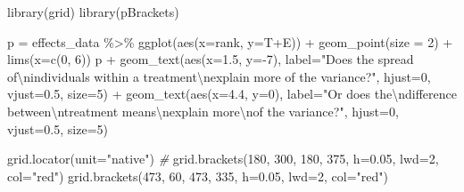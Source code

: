 \documentclass[
]{book}
\newenvironment{Shaded}{\begin{snugshade}}{\end{snugshade}}
\newcommand{\AttributeTok}[1]{\textcolor[rgb]{0.77,0.63,0.00}{#1}}
\newcommand{\CommentTok}[1]{\textcolor[rgb]{0.56,0.35,0.01}{\textit{#1}}}
\newcommand{\DecValTok}[1]{\textcolor[rgb]{0.00,0.00,0.81}{#1}}
\newcommand{\FloatTok}[1]{\textcolor[rgb]{0.00,0.00,0.81}{#1}}
\newcommand{\FunctionTok}[1]{\textcolor[rgb]{0.00,0.00,0.00}{#1}}
\newcommand{\NormalTok}[1]{#1}
\newcommand{\OtherTok}[1]{\textcolor[rgb]{0.56,0.35,0.01}{#1}}
\newcommand{\SpecialCharTok}[1]{\textcolor[rgb]{0.00,0.00,0.00}{#1}}
\newcommand{\StringTok}[1]{\textcolor[rgb]{0.31,0.60,0.02}{#1}}
\begin{document}
\begin{Shaded}
\begin{Highlighting}[]
\FunctionTok{library}\NormalTok{(grid)}
\FunctionTok{library}\NormalTok{(pBrackets)}

\NormalTok{p }\OtherTok{=}\NormalTok{ effects\_data }\SpecialCharTok{\%\textgreater{}\%}
  \FunctionTok{ggplot}\NormalTok{(}\FunctionTok{aes}\NormalTok{(}\AttributeTok{x=}\NormalTok{rank, }\AttributeTok{y=}\NormalTok{T}\SpecialCharTok{+}\NormalTok{E)) }\SpecialCharTok{+}
  \FunctionTok{geom\_point}\NormalTok{(}\AttributeTok{size =} \DecValTok{2}\NormalTok{) }\SpecialCharTok{+}
  \FunctionTok{lims}\NormalTok{(}\AttributeTok{x=}\FunctionTok{c}\NormalTok{(}\DecValTok{0}\NormalTok{, }\DecValTok{6}\NormalTok{))}
\NormalTok{p }\SpecialCharTok{+}  \FunctionTok{geom\_text}\NormalTok{(}\FunctionTok{aes}\NormalTok{(}\AttributeTok{x=}\FloatTok{1.5}\NormalTok{, }\AttributeTok{y=}\SpecialCharTok{{-}}\DecValTok{7}\NormalTok{), }\AttributeTok{label=}\StringTok{"Does the spread of}\SpecialCharTok{\textbackslash{}n}\StringTok{individuals within a treatment}\SpecialCharTok{\textbackslash{}n}\StringTok{explain more of the variance?"}\NormalTok{, }
            \AttributeTok{hjust=}\DecValTok{0}\NormalTok{, }\AttributeTok{vjust=}\FloatTok{0.5}\NormalTok{, }\AttributeTok{size=}\DecValTok{5}\NormalTok{) }\SpecialCharTok{+}
  \FunctionTok{geom\_text}\NormalTok{(}\FunctionTok{aes}\NormalTok{(}\AttributeTok{x=}\FloatTok{4.4}\NormalTok{, }\AttributeTok{y=}\DecValTok{0}\NormalTok{), }\AttributeTok{label=}\StringTok{"Or does the}\SpecialCharTok{\textbackslash{}n}\StringTok{difference between}\SpecialCharTok{\textbackslash{}n}\StringTok{treatment means}\SpecialCharTok{\textbackslash{}n}\StringTok{explain more}\SpecialCharTok{\textbackslash{}n}\StringTok{of the variance?"}\NormalTok{, }
            \AttributeTok{hjust=}\DecValTok{0}\NormalTok{, }\AttributeTok{vjust=}\FloatTok{0.5}\NormalTok{, }\AttributeTok{size=}\DecValTok{5}\NormalTok{) }

\FunctionTok{grid.locator}\NormalTok{(}\AttributeTok{unit=}\StringTok{"native"}\NormalTok{) }
\CommentTok{\# }
\FunctionTok{grid.brackets}\NormalTok{(}\DecValTok{180}\NormalTok{, }\DecValTok{300}\NormalTok{, }\DecValTok{180}\NormalTok{, }\DecValTok{375}\NormalTok{, }\AttributeTok{h=}\FloatTok{0.05}\NormalTok{, }\AttributeTok{lwd=}\DecValTok{2}\NormalTok{, }\AttributeTok{col=}\StringTok{"red"}\NormalTok{)}
\FunctionTok{grid.brackets}\NormalTok{(}\DecValTok{473}\NormalTok{, }\DecValTok{60}\NormalTok{, }\DecValTok{473}\NormalTok{, }\DecValTok{335}\NormalTok{, }\AttributeTok{h=}\FloatTok{0.05}\NormalTok{, }\AttributeTok{lwd=}\DecValTok{2}\NormalTok{, }\AttributeTok{col=}\StringTok{"red"}\NormalTok{)}
\end{Highlighting}
\end{Shaded}
\end{document}
